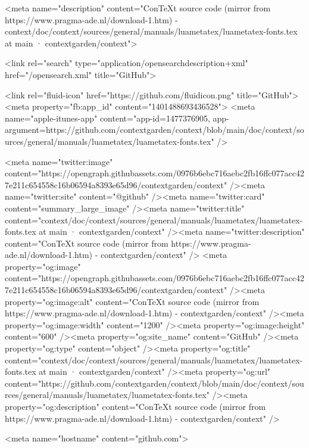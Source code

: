     

      <meta name="description" content="ConTeXt source code (mirror from https://www.pragma-ade.nl/download-1.htm) - context/doc/context/sources/general/manuals/luametatex/luametatex-fonts.tex at main · contextgarden/context">

      <link rel="search" type="application/opensearchdescription+xml" href="/opensearch.xml" title="GitHub">

    <link rel="fluid-icon" href="https://github.com/fluidicon.png" title="GitHub">
    <meta property="fb:app_id" content="1401488693436528">
    <meta name="apple-itunes-app" content="app-id=1477376905, app-argument=https://github.com/contextgarden/context/blob/main/doc/context/sources/general/manuals/luametatex/luametatex-fonts.tex" />

      <meta name="twitter:image" content="https://opengraph.githubassets.com/0976b6ebc716aebc2fb16ffc077acc427e211c654558c16b06594a8393e65d96/contextgarden/context" /><meta name="twitter:site" content="@github" /><meta name="twitter:card" content="summary_large_image" /><meta name="twitter:title" content="context/doc/context/sources/general/manuals/luametatex/luametatex-fonts.tex at main · contextgarden/context" /><meta name="twitter:description" content="ConTeXt source code (mirror from https://www.pragma-ade.nl/download-1.htm) - contextgarden/context" />
  <meta property="og:image" content="https://opengraph.githubassets.com/0976b6ebc716aebc2fb16ffc077acc427e211c654558c16b06594a8393e65d96/contextgarden/context" /><meta property="og:image:alt" content="ConTeXt source code (mirror from https://www.pragma-ade.nl/download-1.htm) - contextgarden/context" /><meta property="og:image:width" content="1200" /><meta property="og:image:height" content="600" /><meta property="og:site_name" content="GitHub" /><meta property="og:type" content="object" /><meta property="og:title" content="context/doc/context/sources/general/manuals/luametatex/luametatex-fonts.tex at main · contextgarden/context" /><meta property="og:url" content="https://github.com/contextgarden/context/blob/main/doc/context/sources/general/manuals/luametatex/luametatex-fonts.tex" /><meta property="og:description" content="ConTeXt source code (mirror from https://www.pragma-ade.nl/download-1.htm) - contextgarden/context" />
  




      <meta name="hostname" content="github.com">



